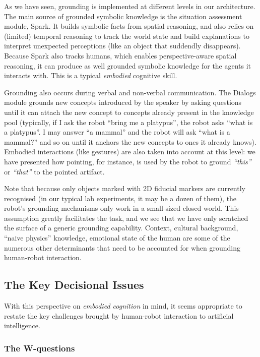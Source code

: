 \documentclass[preprint,3p,times]{elsarticle}
\begin{document}
As we have seen, grounding is implemented at different levels in our
architecture. The main source of grounded symbolic knowledge is the situation
assessment module, {\sc Spark}. It builds symbolic facts from spatial reasoning,
and also relies on (limited) temporal reasoning to track the world state and
build explanations to interpret unexpected perceptions (like an object that
suddendly disappears). Because {\sc Spark} also tracks humans, which enables
perspective-aware spatial reasoning, it can produce as well grounded symbolic
knowledge for the agents it interacts with. This is a typical \emph{embodied}
cognitive skill.

Grounding also occurs during verbal and non-verbal communication. The {\sc
Dialogs} module grounds new concepts introduced by the speaker by asking
questions until it can attach the new concept to concepts already present in the
knowledge pool (typically, if I ask the robot ``bring me a platypus'', the robot
asks ``what is a platypus''. I may answer ``a mammal'' and the robot will ask
``what is a mammal?'' and so on until it anchors the new concepts to ones it
already knows). Embodied interactions (like gestures) are also taken into
account at this level: we have presented how pointing, for instance, is used by
the robot to ground \emph{``this''} or \emph{``that''} to the pointed artifact.

Note that because only objects marked with 2D fiducial markers are currently
recognised (in our typical lab experiments, it may be a dozen of them), the
robot's grounding mechanisms only work in a small-sized closed world. This
assumption greatly facilitates the task, and we see that we have only scratched
the surface of a generic grounding capability. Context, cultural background,
``naive physics'' knowledge, emotional state of the human are some of the
numerous other determinants that need to be accounted for when grounding
human-robot interaction.

\subsection{The Key Decisional Issues}

With this perspective on \emph{embodied cognition} in mind, it seems appropriate
to restate the key challenges brought by human-robot interaction to artificial
intelligence.

\subsubsection{The W-questions}
\end{document}
